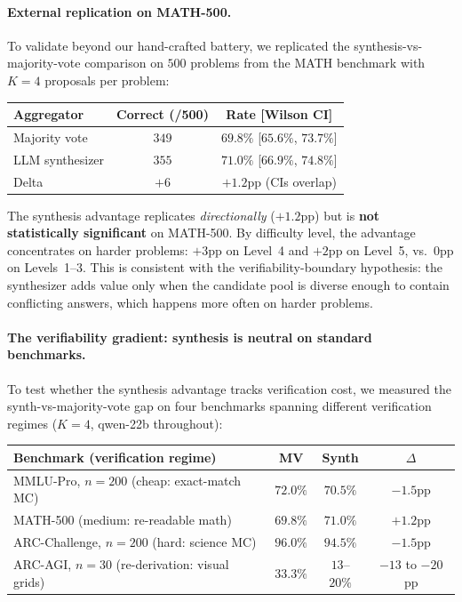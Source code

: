 \documentclass[11pt]{amsart}
\newcommand\1{{\mathds{1}}}
\theoremstyle{definition}
\theoremstyle{remark}
\numberwithin{equation}{section}
\begin{document}
\paragraph{External replication on MATH-500.}
To validate beyond our hand-crafted battery, we replicated the synthesis-vs-majority-vote comparison on $500$ problems from the MATH benchmark \cite{Hendrycks2021MATH} with $K\!=\!4$ proposals per problem:
\begin{center}\small
\begin{tabular}{lcc}
\toprule
Aggregator & Correct (/500) & Rate [Wilson CI] \\
\midrule
Majority vote & $349$ & $69.8\%$ [$65.6\%$, $73.7\%$] \\
LLM synthesizer & $355$ & $71.0\%$ [$66.9\%$, $74.8\%$] \\
\midrule
Delta & $+6$ & $+1.2$pp (CIs overlap) \\
\bottomrule
\end{tabular}
\end{center}
The synthesis advantage replicates \emph{directionally} ($+1.2$pp) but is \textbf{not statistically significant} on MATH-500.
By difficulty level, the advantage concentrates on harder problems: $+3$pp on Level~4 and $+2$pp on Level~5, vs.\ $0$pp on Levels~1--3.
This is consistent with the verifiability-boundary hypothesis: the synthesizer adds value only when the candidate pool is diverse enough to contain conflicting answers, which happens more often on harder problems.

\paragraph{The verifiability gradient: synthesis is neutral on standard benchmarks.}
To test whether the synthesis advantage tracks verification cost, we measured the synth-vs-majority-vote gap on four benchmarks spanning different verification regimes ($K\!=\!4$, qwen-22b throughout):
\begin{center}\small
\begin{tabular}{@{}lccc@{}}
\toprule
Benchmark (verification regime) & MV & Synth & $\Delta$ \\
\midrule
MMLU-Pro, $n\!=\!200$ (cheap: exact-match MC) & $72.0\%$ & $70.5\%$ & $-1.5$pp \\
MATH-500 (medium: re-readable math) & $69.8\%$ & $71.0\%$ & $+1.2$pp \\
ARC-Challenge, $n\!=\!200$ (hard: science MC) & $96.0\%$ & $94.5\%$ & $-1.5$pp \\
\midrule
ARC-AGI, $n\!=\!30$ (re-derivation: visual grids) & $33.3\%$ & $13$--$20\%$ & $-13$ to $-20$pp \\
\bottomrule
\end{tabular}
\end{center}
\end{document}

